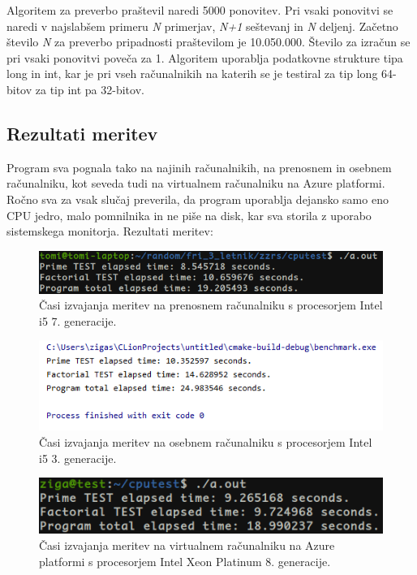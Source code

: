 Algoritem za preverbo praštevil naredi 5000 ponovitev. Pri vsaki ponovitvi se naredi v najslabšem primeru \textit{N} primerjav, \textit{N+1} seštevanj in \textit{N} deljenj. Začetno število \textit{N} za preverbo pripadnosti praštevilom je 10.050.000. Število za izračun se pri vsaki ponovitvi poveča za 1. Algoritem uporablja podatkovne strukture tipa long in int, kar je pri vseh računalnikih na katerih se je testiral za tip long 64-bitov za tip int pa 32-bitov. 



\subsection{Rezultati meritev}

Program sva pognala tako na najinih računalnikih, na prenosnem in osebnem računalniku, kot seveda tudi na virtualnem računalniku na Azure platformi. Ročno sva za vsak slučaj preverila, da program uporablja dejansko samo eno CPU jedro, malo pomnilnika in ne piše na disk, kar sva storila z uporabo sistemskega monitorja. Rezultati meritev:

\begin{figure}[H]
	\centering
	\includegraphics[scale=0.66]{Img/T_cputest.png}
	\caption{Časi izvajanja meritev na prenosnem računalniku s procesorjem Intel i5 7. generacije.}
	\label{fig:7_breme2}
\end{figure}

\begin{figure}[H]
	\centering
	\includegraphics[scale=0.8]{Img/Z_cputest.png}
	\caption{Časi izvajanja meritev na osebnem računalniku s procesorjem Intel i5 3. generacije.}
	\label{fig:7_breme2}
\end{figure}

\begin{figure}[H]
	\centering
	\includegraphics[scale=0.66]{Img/Azure_cputest.png}
	\caption{Časi izvajanja meritev na virtualnem računalniku na Azure platformi s procesorjem Intel Xeon Platinum 8. generacije.}
	\label{fig:7_breme2}
\end{figure}

